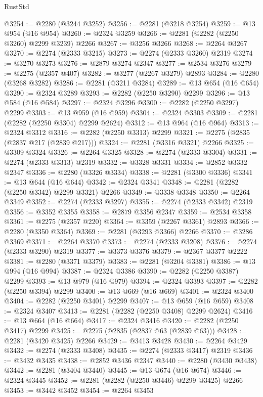 \begin{lexlean}{RustStd}
\begin{coremodule}
@3254 := @2280 (@3244 @3252)
@3256 := @2281 (@3218 @3254)
@3259 := @13 @954 (@16 @954)
@3260 := @2324 @3259
@3266 := @2281 (@2282 (@2250 @3260) @2299 @3239) @2266
@3267 := @3256 @3266
@3268 := @2264 @3267
@3270 := @2274 (@2333 @3215)
@3273 := @2274 (@2333 @3260) @2319
@3274 := @3270 @3273
@3276 := @2879 @3274 @2347
@3277 := @2534 @3276
@3279 := @2275 (@2357 @407)
@3282 := @3277 (@2267 @3279) @2893
@3284 := @2280 (@3268 @3282)
@3286 := @2281 (@3211 @3284)
@3289 := @13 @654 (@16 @654)
@3290 := @2324 @3289
@3293 := @2282 (@2250 @3290) @2299
@3296 := @13 @584 (@16 @584)
@3297 := @2324 @3296
@3300 := @2282 (@2250 @3297) @2299
@3303 := @13 @959 (@16 @959)
@3304 := @2324 @3303
@3309 := @2281 (@2282 (@2250 @3304) @2299 @2624)
@3312 := @13 @964 (@16 @964)
@3313 := @2324 @3312
@3316 := @2282 (@2250 @3313) @2299
@3321 := @2275 (@2835 (@2837 @217 (@2839 @217)))
@3324 := @2281 (@3316 @3321) @2266
@3325 := @3309 @3324
@3326 := @2264 @3325
@3328 := @2274 (@2333 @3304)
@3331 := @2274 (@2333 @3313) @2319
@3332 := @3328 @3331
@3334 := @2852 @3332 @2347
@3336 := @2280 (@3326 @3334)
@3338 := @2281 (@3300 @3336)
@3341 := @13 @644 (@16 @644)
@3342 := @2324 @3341
@3348 := @2281 (@2282 (@2250 @3342) @2299 @3321) @2266
@3349 := @3338 @3348
@3350 := @2264 @3349
@3352 := @2274 (@2333 @3297)
@3355 := @2274 (@2333 @3342) @2319
@3356 := @3352 @3355
@3358 := @2879 @3356 @2347
@3359 := @2534 @3358
@3361 := @2275 (@2357 @220)
@3364 := @3359 (@2267 @3361) @2893
@3366 := @2280 (@3350 @3364)
@3369 := @2281 (@3293 @3366) @2266
@3370 := @3286 @3369
@3371 := @2264 @3370
@3373 := @2274 (@2333 @3208)
@3376 := @2274 (@2333 @3290) @2319
@3377 := @3373 @3376
@3379 := @2367 @3377 @2222
@3381 := @2280 (@3371 @3379)
@3383 := @2281 (@3204 @3381)
@3386 := @13 @994 (@16 @994)
@3387 := @2324 @3386
@3390 := @2282 (@2250 @3387) @2299
@3393 := @13 @979 (@16 @979)
@3394 := @2324 @3393
@3397 := @2282 (@2250 @3394) @2299
@3400 := @13 @669 (@16 @669)
@3401 := @2324 @3400
@3404 := @2282 (@2250 @3401) @2299
@3407 := @13 @659 (@16 @659)
@3408 := @2324 @3407
@3413 := @2281 (@2282 (@2250 @3408) @2299 @2624)
@3416 := @13 @664 (@16 @664)
@3417 := @2324 @3416
@3420 := @2282 (@2250 @3417) @2299
@3425 := @2275 (@2835 (@2837 @63 (@2839 @63)))
@3428 := @2281 (@3420 @3425) @2266
@3429 := @3413 @3428
@3430 := @2264 @3429
@3432 := @2274 (@2333 @3408)
@3435 := @2274 (@2333 @3417) @2319
@3436 := @3432 @3435
@3438 := @2852 @3436 @2347
@3440 := @2280 (@3430 @3438)
@3442 := @2281 (@3404 @3440)
@3445 := @13 @674 (@16 @674)
@3446 := @2324 @3445
@3452 := @2281 (@2282 (@2250 @3446) @2299 @3425) @2266
@3453 := @3442 @3452
@3454 := @2264 @3453

\end{coremodule}
\end{lexlean}
